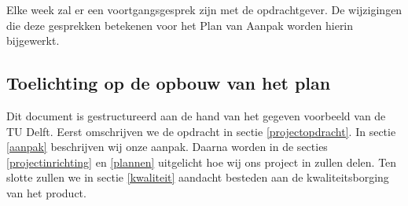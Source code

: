 Elke week zal er een voortgangsgesprek zijn met de opdrachtgever.
De wijzigingen die deze gesprekken betekenen voor het Plan van Aanpak worden hierin bijgewerkt.

\subsection{Toelichting op de opbouw van het plan}

Dit document is gestructureerd aan de hand van het gegeven voorbeeld van de TU Delft.
Eerst omschrijven we de opdracht in sectie \ref{projectopdracht}.
In sectie \ref{aanpak} beschrijven wij onze aanpak.
Daarna worden in de secties \ref{projectinrichting} en \ref{plannen} uitgelicht hoe wij ons project in zullen delen.
Ten slotte zullen we in sectie \ref{kwaliteit} aandacht besteden aan de kwaliteitsborging van het product.
